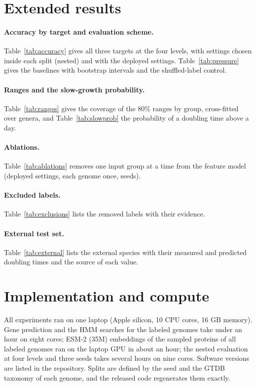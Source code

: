 \section{Extended results}\label{app:extra}

\paragraph{Accuracy by target and evaluation scheme.} Table~\ref{tab:accuracy} gives all three targets at the four levels,
with settings chosen inside each split (nested) and with the deployed settings. Table~\ref{tab:pressure} gives the
baselines with bootstrap intervals and the shuffled-label control.




\paragraph{Ranges and the slow-growth probability.} Table~\ref{tab:ranges} gives the coverage of the 80\% ranges by group,
cross-fitted over genera, and Table~\ref{tab:slowprob} the probability of a doubling time above a day.



\paragraph{Ablations.} Table~\ref{tab:ablations} removes one input group at a time from the feature model (deployed
settings, each genome once, \NSeedsAblation seeds).



\paragraph{Excluded labels.} Table~\ref{tab:exclusions} lists the removed labels with their evidence.



\paragraph{External test set.} Table~\ref{tab:external} lists the external species with their measured and predicted
doubling times and the source of each value.



\section{Implementation and compute}\label{app:compute}
All experiments ran on one laptop (Apple silicon, 10 CPU cores, 16 GB memory). Gene prediction and the HMM searches for the
labeled genomes take under an hour on eight cores; ESM-2 (35M) embeddings of the sampled proteins of all labeled genomes ran
on the laptop GPU in about an hour; the nested evaluation at four levels and three seeds takes several hours on nine cores.
Software versions are listed in the repository. Splits are defined by the seed and the GTDB taxonomy of each genome, and the
released code regenerates them exactly.
